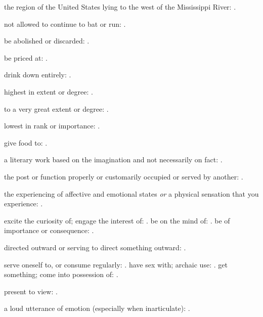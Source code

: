  the region of the United States lying to the west of the Mississippi River:   .

  not allowed to continue to bat or run: .

  be abolished or discarded: .

  be priced at:   .

  drink down entirely:   .

  highest in extent or degree:   .

  to a very great extent or degree: .

  lowest in rank or importance:   .

  give food to:   .

  a literary work based on the imagination and not necessarily on fact: .

  the post or function properly or customarily occupied or served by another:   .

  the experiencing of affective and emotional states \textit{or} a physical sensation that you experience: .

  excite the curiosity of; engage the interest of: . be on the mind of:   . be of importance or consequence:   .

  directed outward or serving to direct something outward: .

  serve oneself to, or consume regularly:   . have sex with; archaic use:   . get something; come into possession of:   .

  present to view: .

  a loud utterance of emotion (especially when inarticulate):   .

